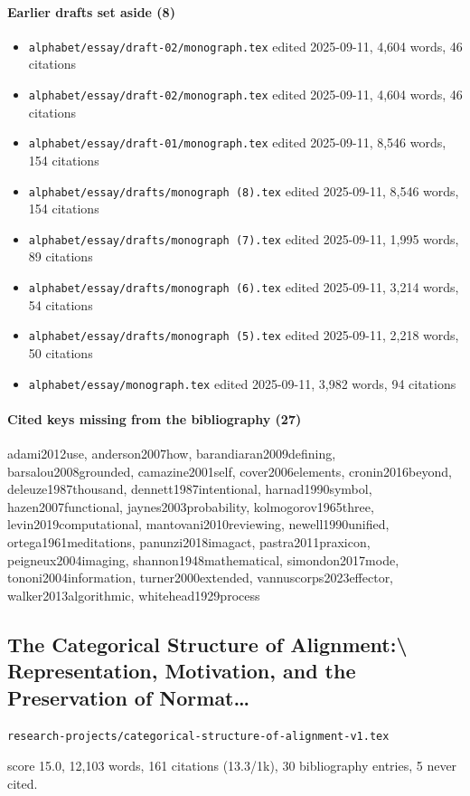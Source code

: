 \documentclass[11pt]{article}
\newcommand{\loc}[1]{{\small\color{muted}\texttt{#1}}}
\begin{document}
\paragraph{Earlier drafts set aside (8)}
\begin{itemize}
\item \loc{alphabet/\allowbreak{}essay/\allowbreak{}draft-02/\allowbreak{}monograph.tex} edited 2025-09-11, 4,604 words, 46 citations
\item \loc{alphabet/\allowbreak{}essay/\allowbreak{}draft-02/\allowbreak{}monograph.tex} edited 2025-09-11, 4,604 words, 46 citations
\item \loc{alphabet/\allowbreak{}essay/\allowbreak{}draft-01/\allowbreak{}monograph.tex} edited 2025-09-11, 8,546 words, 154 citations
\item \loc{alphabet/\allowbreak{}essay/\allowbreak{}drafts/\allowbreak{}monograph (8).tex} edited 2025-09-11, 8,546 words, 154 citations
\item \loc{alphabet/\allowbreak{}essay/\allowbreak{}drafts/\allowbreak{}monograph (7).tex} edited 2025-09-11, 1,995 words, 89 citations
\item \loc{alphabet/\allowbreak{}essay/\allowbreak{}drafts/\allowbreak{}monograph (6).tex} edited 2025-09-11, 3,214 words, 54 citations
\item \loc{alphabet/\allowbreak{}essay/\allowbreak{}drafts/\allowbreak{}monograph (5).tex} edited 2025-09-11, 2,218 words, 50 citations
\item \loc{alphabet/\allowbreak{}essay/\allowbreak{}monograph.tex} edited 2025-09-11, 3,982 words, 94 citations
\end{itemize}
\paragraph{Cited keys missing from the bibliography (27)}
{\small\ttfamily\raggedright adami2012use, anderson2007how, barandiaran2009defining, barsalou2008grounded, camazine2001self, cover2006elements, cronin2016beyond, deleuze1987thousand, dennett1987intentional, harnad1990symbol, hazen2007functional, jaynes2003probability, kolmogorov1965three, levin2019computational, mantovani2010reviewing, newell1990unified, ortega1961meditations, panunzi2018imagact, pastra2011praxicon, peigneux2004imaging, shannon1948mathematical, simondon2017mode, tononi2004information, turner2000extended, vannuscorps2023effector, walker2013algorithmic, whitehead1929process\par}
\subsection{The Categorical Structure of Alignment:\textbackslash{} Representation, Motivation, and the Preservation of Normat\ldots{}}
\loc{research-projects/\allowbreak{}categorical-structure-of-alignment-v1.tex}\par
score 15.0, 12,103 words, 161 citations (13.3/1k), 30 bibliography entries, 5 never cited.
\end{document}
